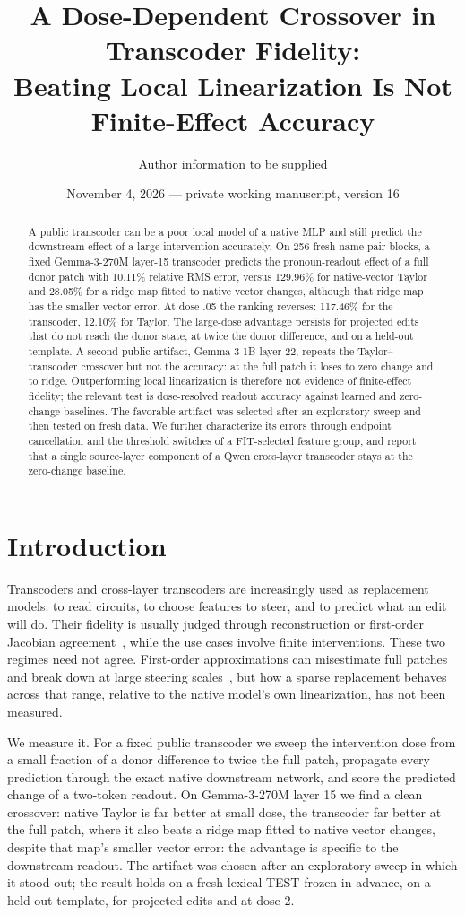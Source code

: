 \documentclass[11pt]{article}
\title{A Dose-Dependent Crossover in Transcoder Fidelity:\\Beating Local Linearization Is Not Finite-Effect Accuracy}
\author{Author information to be supplied}
\date{November 4, 2026 --- private working manuscript, version 16}
\begin{document}
\maketitle
\begin{abstract}
A public transcoder can be a poor local model of a native MLP and still predict the downstream effect of a large intervention accurately. On 256 fresh name-pair blocks, a fixed Gemma-3-270M layer-15 transcoder predicts the pronoun-readout effect of a full donor patch with 10.11\% relative RMS error, versus 129.96\% for native-vector Taylor and 28.05\% for a ridge map fitted to native vector changes, although that ridge map has the smaller vector error. At dose .05 the ranking reverses: 117.46\% for the transcoder, 12.10\% for Taylor. The large-dose advantage persists for projected edits that do not reach the donor state, at twice the donor difference, and on a held-out template. A second public artifact, Gemma-3-1B layer 22, repeats the Taylor--transcoder crossover but not the accuracy: at the full patch it loses to zero change and to ridge. Outperforming local linearization is therefore not evidence of finite-effect fidelity; the relevant test is dose-resolved readout accuracy against learned and zero-change baselines. The favorable artifact was selected after an exploratory sweep and then tested on fresh data. We further characterize its errors through endpoint cancellation and the threshold switches of a FIT-selected feature group, and report that a single source-layer component of a Qwen cross-layer transcoder stays at the zero-change baseline.
\end{abstract}

\section{Introduction}
Transcoders and cross-layer transcoders are increasingly used as replacement models: to read circuits, to choose features to steer, and to predict what an edit will do. Their fidelity is usually judged through reconstruction or first-order Jacobian agreement~\cite{shabalin2026}, while the use cases involve finite interventions. These two regimes need not agree. First-order approximations can misestimate full patches~\cite{syed2023} and break down at large steering scales~\cite{guo2026}, but how a sparse replacement behaves across that range, relative to the native model's own linearization, has not been measured.

We measure it. For a fixed public transcoder we sweep the intervention dose from a small fraction of a donor difference to twice the full patch, propagate every prediction through the exact native downstream network, and score the predicted change of a two-token readout. On Gemma-3-270M layer 15 we find a clean crossover: native Taylor is far better at small dose, the transcoder far better at the full patch, where it also beats a ridge map fitted to native vector changes, despite that map's smaller vector error: the advantage is specific to the downstream readout. The artifact was chosen after an exploratory sweep in which it stood out; the result holds on a fresh lexical TEST frozen in advance, on a held-out template, for projected edits and at dose 2.
\end{document}

